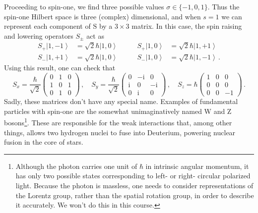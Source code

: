\documentclass{article}
\theoremstyle{plain}\theoremheaderfont{\normalfont\itshape}\theorembodyfont{\rmfamily}\theoremseparator{.}\newtheorem*{rem}{Remark}\newtheorem*{ex}{Example}\newtheorem*{proof}{Proof}\newtheorem*{altp}{Alternative proof}
\theoremstyle{plain}\theoremheaderfont{\normalfont\bfseries}\theorembodyfont{\rmfamily}\theoremseparator{.}\newtheorem{thm}{Theorem}[section]\newtheorem{lem}[thm]{Lemma}\newtheorem{prop}[thm]{Proposition}\newtheorem*{cor}{Corollary}\newtheorem{defn}[thm]{Definition}\newtheorem{clm}[thm]{Claim}\newtheorem{clminproof}{Claim}
\theoremstyle{break}\theoremheaderfont{\normalfont\itshape}\theorembodyfont{\rmfamily}\theoremseparator{.\medskip}\newtheorem*{proofskip}{Proof}\newtheorem*{exs}{Examples}\newtheorem*{rems}{Remarks}
\theoremstyle{break}\theoremheaderfont{\normalfont\bfseries}\theorembodyfont{\rmfamily}\theoremseparator{.\medskip}\newtheorem{lemskip}[thm]{Lemma}\newtheorem{defnskip}[thm]{Definition}\newtheorem{propskip}[thm]{Proposition}\newtheorem{thmskip}[thm]{Theorem}
\numberwithin{equation}{section}
\newcommand{\ii}{\mathrm{i}}
\newcommand{\ket}[1]{\left| #1 \right\rangle}
\newcommand{\vb}[1]{\bm{\mathrm{#1}}}
\begin{document}
    Proceeding to spin-one, we find three possible values \(\sigma\in\{-1,0,1\}\). Thus the spin-one Hilbert space is three (complex) dimensional, and when \(s=1\) we can represent each component of \(\vb{S}\) by a \(3\times 3\) matrix. In this case, the spin raising and lowering operators \(S_\pm\) act as
    \begin{equation}
        \begin{aligned}
            S_+\ket{1,-1}&=\sqrt{2}\hbar\ket{1,0}\qquad & S_+\ket{1,0}&=\sqrt{2}\hbar\ket{1,+1}\\
            S_-\ket{1,+1}&=\sqrt{2}\hbar\ket{1,0}\qquad & S_-\ket{1,0}&=\sqrt{2}\hbar\ket{1,-1}\,.
        \end{aligned}
    \end{equation}
    Using this result, one can check that
    \begin{equation}
        S_x=\frac{\hbar}{\sqrt{2}}\begin{pmatrix}
            0 & 1 & 0 \\
            1 & 0 & 1 \\
            0 & 1 & 0
        \end{pmatrix}\,,\quad S_y=\frac{\hbar}{\sqrt{2}}\begin{pmatrix}
            0 & -\ii & 0 \\
            \ii & 0 & -\ii \\
            0 & \ii & 0
        \end{pmatrix}\,,\quad S_z=\hbar\begin{pmatrix}
            1 & 0 & 0 \\
            0 & 0 & 0 \\
            0 & 0 & -1
        \end{pmatrix}\,.
    \end{equation}
    Sadly, these matrices don't have any special name. Examples of fundamental particles with spin-one are the somewhat unimaginatively named W and Z bosons\footnote{Although the photon carries one unit of \(\hbar\) in intrinsic angular momentum, it has only two possible states corresponding to left- or right- circular polarized light. Because the photon is massless, one needs to consider representations of the Lorentz group, rather than the spatial rotation group, in order to describe it accurately. We won't do this in this course.}. These are responsible for the weak interactions that, among other things, allows two hydrogen nuclei to fuse into Deuterium, powering nuclear fusion in the core of stars.
\end{document}
